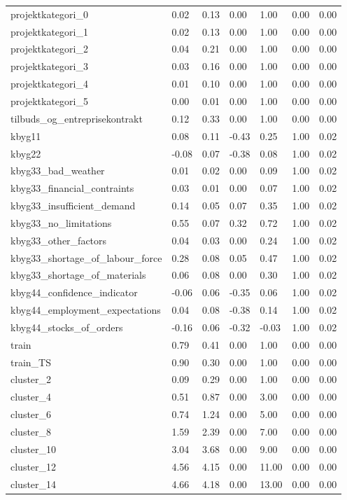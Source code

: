 \begin{landscape}
\begin{longtable}[h!]{lllllll}
projektkategori_0 & 0.02 & 0.13 & 0.00 & 1.00 & 0.00 & 0.00 \\
projektkategori_1 & 0.02 & 0.13 & 0.00 & 1.00 & 0.00 & 0.00 \\
projektkategori_2 & 0.04 & 0.21 & 0.00 & 1.00 & 0.00 & 0.00 \\
projektkategori_3 & 0.03 & 0.16 & 0.00 & 1.00 & 0.00 & 0.00 \\
projektkategori_4 & 0.01 & 0.10 & 0.00 & 1.00 & 0.00 & 0.00 \\
projektkategori_5 & 0.00 & 0.01 & 0.00 & 1.00 & 0.00 & 0.00 \\
tilbuds_og_entreprisekontrakt & 0.12 & 0.33 & 0.00 & 1.00 & 0.00 & 0.00 \\
kbyg11 & 0.08 & 0.11 & -0.43 & 0.25 & 1.00 & 0.02 \\
kbyg22 & -0.08 & 0.07 & -0.38 & 0.08 & 1.00 & 0.02 \\
kbyg33_bad_weather & 0.01 & 0.02 & 0.00 & 0.09 & 1.00 & 0.02 \\
kbyg33_financial_contraints & 0.03 & 0.01 & 0.00 & 0.07 & 1.00 & 0.02 \\
kbyg33_insufficient_demand & 0.14 & 0.05 & 0.07 & 0.35 & 1.00 & 0.02 \\
kbyg33_no_limitations & 0.55 & 0.07 & 0.32 & 0.72 & 1.00 & 0.02 \\
kbyg33_other_factors & 0.04 & 0.03 & 0.00 & 0.24 & 1.00 & 0.02 \\
kbyg33_shortage_of_labour_force & 0.28 & 0.08 & 0.05 & 0.47 & 1.00 & 0.02 \\
kbyg33_shortage_of_materials & 0.06 & 0.08 & 0.00 & 0.30 & 1.00 & 0.02 \\
kbyg44_confidence_indicator & -0.06 & 0.06 & -0.35 & 0.06 & 1.00 & 0.02 \\
kbyg44_employment_expectations & 0.04 & 0.08 & -0.38 & 0.14 & 1.00 & 0.02 \\
kbyg44_stocks_of_orders & -0.16 & 0.06 & -0.32 & -0.03 & 1.00 & 0.02 \\
train & 0.79 & 0.41 & 0.00 & 1.00 & 0.00 & 0.00 \\
train_TS & 0.90 & 0.30 & 0.00 & 1.00 & 0.00 & 0.00 \\
cluster_2 & 0.09 & 0.29 & 0.00 & 1.00 & 0.00 & 0.00 \\
cluster_4 & 0.51 & 0.87 & 0.00 & 3.00 & 0.00 & 0.00 \\
cluster_6 & 0.74 & 1.24 & 0.00 & 5.00 & 0.00 & 0.00 \\
cluster_8 & 1.59 & 2.39 & 0.00 & 7.00 & 0.00 & 0.00 \\
cluster_10 & 3.04 & 3.68 & 0.00 & 9.00 & 0.00 & 0.00 \\
cluster_12 & 4.56 & 4.15 & 0.00 & 11.00 & 0.00 & 0.00 \\
cluster_14 & 4.66 & 4.18 & 0.00 & 13.00 & 0.00 & 0.00 \\
\end{longtable}\end{landscape}
